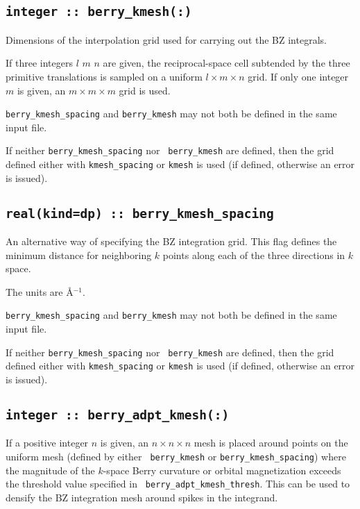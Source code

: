 \subsection[berry\_kmesh]{\tt integer :: berry\_kmesh(:)}
Dimensions of the interpolation grid used for carrying out the BZ
integrals.

If three integers $l$ $m$ $n$ are given, the reciprocal-space cell
subtended by the three primitive translations is sampled on a uniform
$l\times m\times n$ grid.  If only one integer $m$ is given, an
$m\times m\times m$ grid is used.

{\tt berry\_kmesh\_spacing} and {\tt berry\_kmesh} may not
both be defined in the same input file.

If neither {\tt berry\_kmesh\_spacing} nor {\tt
  berry\_kmesh} are defined, then the grid defined either with
{\tt kmesh\_spacing} or {\tt kmesh} is used (if defined,
otherwise an error is issued).

\subsection[berry\_kmesh\_spacing]{\tt real(kind=dp) :: berry\_kmesh\_spacing}
An alternative way of specifying the BZ integration grid. This flag
defines the minimum distance for neighboring $k$ points along each of
the three directions in $k$ space.


The units are \AA$^{-1}$.

{\tt berry\_kmesh\_spacing} and {\tt berry\_kmesh} may
not both be defined in the same input file.

If neither {\tt berry\_kmesh\_spacing} nor {\tt
  berry\_kmesh} are defined, then the grid defined either with
{\tt kmesh\_spacing} or {\tt kmesh} is used (if defined,
otherwise an error is issued).


\subsection[berry\_adpt\_kmesh]{\tt integer :: berry\_adpt\_kmesh(:)}

If a positive integer $n$ is given, an $n\times n\times n$ mesh is
placed around points on the uniform mesh (defined by either {\tt
  berry\_kmesh} or {\tt berry\_kmesh\_spacing}) where
the magnitude of the $k$-space Berry curvature or orbital
magnetization exceeds the threshold value specified in {\tt
  berry\_adpt\_kmesh\_thresh}. This can be used to densify the BZ
integration mesh around spikes in the integrand.

